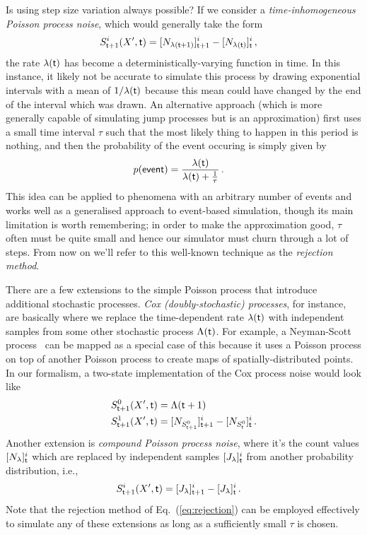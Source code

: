 \documentclass{book}
\begin{document}
Is using step size variation always possible? If we consider a \emph{time-inhomogeneous Poisson process noise}, which would generally take the form
\begin{align}
S^{i}_{{\sf t}+1}(X',{\sf t}) &= [N_{\lambda ({\sf t}+1)}]^i_{{\sf t}+1}-[N_{\lambda ({\sf t})}]^i_{\sf t}\,,
\end{align}
the rate $\lambda ({\sf t})$ has become a deterministically-varying function in time. In this instance, it likely not be accurate to simulate this process by drawing exponential intervals with a mean of $1/\lambda ({\sf t})$ because this mean could have changed by the end of the interval which was drawn. An alternative approach (which is more generally capable of simulating jump processes but is an approximation) first uses a small time interval $\tau$ such that the most likely thing to happen in this period is nothing, and then the probability of the event occuring is simply given by
\begin{align}
p({\sf event}) &= \frac{\lambda ({\sf t})}{\lambda ({\sf t}) + \frac{1}{\tau}} \label{eq:rejection}\,.
\end{align}
This idea can be applied to phenomena with an arbitrary number of events and works well as a generalised approach to event-based simulation, though its main limitation is worth remembering; in order to make the approximation good, $\tau$ often must be quite small and hence our simulator must churn through a lot of steps. From now on we'll refer to this well-known technique as the \emph{rejection method}.

There are a few extensions to the simple Poisson process that introduce additional stochastic processes. \emph{Cox (doubly-stochastic) processes}, for instance, are basically where we replace the time-dependent rate $\lambda ({\sf t})$ with independent samples from some other stochastic process $\Lambda ({\sf t})$. For example, a Neyman-Scott process~\cite{neyman1958statistical} can be mapped as a special case of this because it uses a Poisson process on top of another Poisson process to create maps of spatially-distributed points. In our formalism, a two-state implementation of the Cox process noise would look like
\begin{align}
S^{0}_{{\sf t}+1}(X',{\sf t}) &= \Lambda ({\sf t}+1) \\
S^{1}_{{\sf t}+1}(X',{\sf t}) &= [N_{S^{0}_{{\sf t}+1}}]^i_{{\sf t}+1}-[N_{S^{0}_{{\sf t}}}]^i_{\sf t}\,.
\end{align}
Another extension is \emph{compound Poisson process noise}, where it's the count values $[N_{\lambda}]^i_{\sf t}$ which are replaced by independent samples $[J_{\lambda}]^i_{\sf t}$ from another probability distribution, i.e.,
\begin{align}
S^{i}_{{\sf t}+1}(X',{\sf t}) &= [J_{\lambda}]^i_{{\sf t}+1}-[J_{\lambda}]^i_{\sf t}\,.
\end{align}
Note that the rejection method of Eq.~(\ref{eq:rejection}) can be employed effectively to simulate any of these extensions as long as a sufficiently small $\tau$ is chosen.
\end{document}
